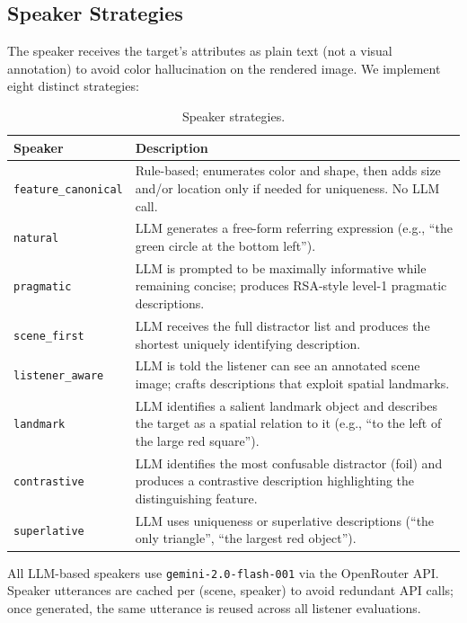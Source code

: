 \subsection{Speaker Strategies}
\label{sec:speakers}

The speaker receives the target's attributes as plain text (not a visual
annotation) to avoid color hallucination on the rendered image. 
We implement eight distinct strategies:

\begin{table}[H]
\centering
\small
\begin{tabular}{lp{10.8cm}}
\toprule
\textbf{Speaker} & \textbf{Description} \\
\midrule
\texttt{feature\_canonical} & Rule-based; enumerates color and shape, then adds size and/or location only if needed for uniqueness. No LLM call. \\[4pt]
\texttt{natural} & LLM generates a free-form referring expression
  (e.g., ``the green circle at the bottom left''). \\[4pt]
\texttt{pragmatic} & LLM is prompted to be maximally informative while remaining concise; produces RSA-style level-1 pragmatic descriptions. \\[4pt]
\texttt{scene\_first} & LLM receives the full distractor list and produces the shortest uniquely identifying description. \\[4pt]
\texttt{listener\_aware} & LLM is told the listener can see an annotated scene image; crafts descriptions that exploit spatial landmarks. \\[4pt]
\texttt{landmark} & LLM identifies a salient landmark object and describes the target as a spatial relation to it (e.g., ``to the left of the large red square''). \\[4pt]
\texttt{contrastive} & LLM identifies the most confusable distractor (foil) and produces a contrastive description highlighting the distinguishing feature. \\[4pt]
\texttt{superlative} & LLM uses uniqueness or superlative descriptions (``the only triangle'', ``the largest red object''). \\
\bottomrule
\end{tabular}
\caption{Speaker strategies.}
\label{tab:speakers}
\end{table}

All LLM-based speakers use \texttt{gemini-2.0-flash-001} via the OpenRouter
API.  Speaker utterances are cached per (scene, speaker) to avoid redundant
API calls; once generated, the same utterance is reused across all listener
evaluations.

